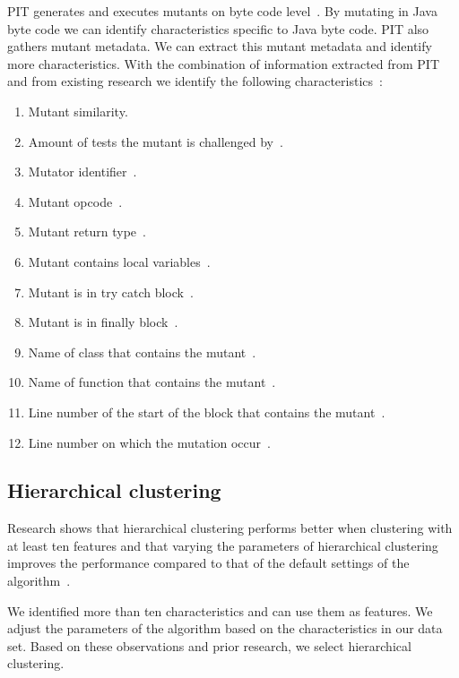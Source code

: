 \documentclass[conference,draftclsnofoot,onecolumn]{IEEEtran}
\begin{document}
PIT generates and executes mutants on byte code level~\cite{pitestBytecode}.
By mutating in Java byte code we can identify characteristics specific to Java byte code. PIT also gathers mutant metadata. We can extract this mutant metadata and identify more characteristics.  With the combination of information extracted from PIT and from existing research we identify the following characteristics~\cite{thesis}:
\begin{enumerate}
    \item Mutant similarity.
    \item Amount of tests the mutant is challenged by~\cite{Zhang2019PredictiveTesting, Oonk2021, pit}.
    \item Mutator identifier~\cite{pit}.
    \item Mutant opcode~\cite{Oonk2021, pit}.
    \item Mutant return type~\cite{Zhang2019PredictiveTesting, Oonk2021, pit}.
    \item Mutant contains local variables~\cite{pit}.
    \item Mutant is in try catch block~\cite{pit}.
    \item Mutant is in finally block~\cite{pit}.
    \item Name of class that contains the mutant~\cite{Oonk2021, pit}.
    \item Name of function that contains the mutant~\cite{Oonk2021, pit}.
    \item Line number of the start of the block that contains the mutant~\cite{pit}.
    \item Line number on which the mutation occur~\cite{pit}.
\end{enumerate}

\subsection{Hierarchical clustering}
Research shows that hierarchical clustering performs better when clustering with at least ten features and that varying the parameters of hierarchical clustering improves the performance compared to that of the default settings of the algorithm~\cite{Rodriguez2019}.

We identified more than ten characteristics and can use them as features. We adjust the parameters of the algorithm based on the characteristics in our data set.
Based on these observations and prior research, we select hierarchical clustering.
\end{document}
